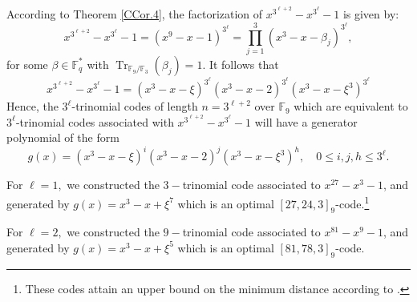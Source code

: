 \documentclass[12pt]{elsarticle}
\newcommand{\hlc}[2][yellow]{ {\sethlcolor{#1} \hl{#2}} }
\newcommand{\Fq}{\mathbb{F}_{q}}
\theoremstyle{break}
{\theorembodyfont{\upshape}
    \newtheorem{theorem}{Theorem}[section] %
    \newtheorem{lemma}[theorem]{Lemma} %
    \newtheorem{proposition}[theorem]{Proposition}
    \newtheorem{corollary}[theorem]{Corollary}
    \newtheorem{definition}[theorem]{Definition}
    \newtheorem{example}[theorem]{Example}
    \newtheorem{remark}[theorem]{Remark}
    \newtheorem{conjecture}[theorem]{Conjecture}
    \newtheorem*{proof}{{Proof}}
	\newtheorem*{notation}{Notation}
	\newtheorem*{main}{Cain Theorem}
	\newtheorem*{problem}{Problem}
}
\begin{document}
\begin{example}[$3^{\ell}$-trinomial codes of length $n=3^{\ell+2}$ over $\mathbb{F}_9$]
 According to  Theorem \ref{CCor.4},  the factorization of $x^{3^{\ell+2}} - x^{3^{\ell}} - 1$ is given by:
$$ x^{3^{\ell+2}} - x^{3^{\ell}} - 1= (x^9-x-1)^{3^{\ell}} = \prod_{j=1}^{3} \left( x^3 - x - \beta_j \right)^{3^{\ell}},
$$
for some $\beta \in \Fq^*$ with $\operatorname{Tr}_{\mathbb{F}_9 / \mathbb{F}_3}(\beta_j) = 1$. 
It follows that 
$$ x^{3^{\ell+2}} - x^{3^{\ell}} - 1= \left( x^3 - x - \xi \right)^{3^{\ell}} \left( x^3 - x - 2 \right)^{3^{\ell}} \left( x^3 - x - \xi^3 \right)^{3^{\ell}} $$
Hence, the $3^{\ell}$-trinomial codes of length $n=3^{\ell+2}$ over $ \mathbb{F}_{9}$ which are  equivalent to  $3^{\ell}$-trinomial codes associated with $ x^{3^{\ell+2}}-x^{3^{\ell}}-1$
will have a generator polynomial of the form  
$$g(x)=  \left( x^3 - x - \xi \right)^{i} \left( x^3 - x - 2 \right)^{j} \left( x^3 - x - \xi^3 \right)^{h}  ,\quad 0 \leq  i,j,h \leq 3^{\ell}.$$ 

For $\ell=1, $ we constructed the $ 3-$trinomial code associated to $x^{27}-x^3-1$,  and generated by $g(x)=x^3 -x + \xi^7$ which is an optimal $[27,24,3]_9$-code.\footnote{These codes attain an upper bound on the minimum distance according to \cite{databases}.}

For $\ell=2, $ we constructed the $ 9-$trinomial code associated to $x^{81}-x^9-1$,  and generated by $g(x)=x^3 -x + \xi^5$ which is an optimal $[81,78,3]_9$-code.\footnotemark[4]

\end{example}
\end{document}

